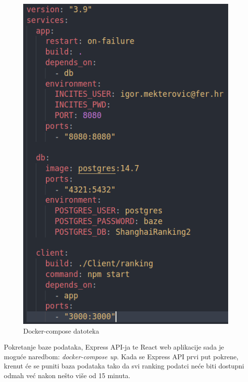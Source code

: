 \documentclass[times, utf8, zavrsni]{fer}
\begin{document}
\begin{figure}[htb]
        \centering
           \includegraphics[scale=0.33]{docker2.png} 
           \caption{Docker-compose datoteka}
           \label{fig:docker2}
           \end{figure}       
           \FloatBarrier
Pokretanje baze podataka, Express API-ja te React web aplikacije sada je moguće naredbom: \emph{docker-compose up}. Kada se Express API prvi put pokrene, krenut će se 
puniti baza podataka tako da svi ranking podatci neće biti dostupni odmah već nakon nešto više od 15 minuta.
\end{document}
